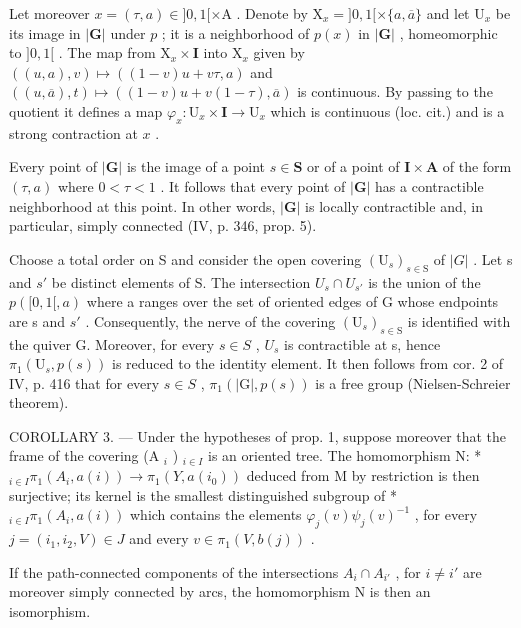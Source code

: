 Let moreover \(x = (\tau, a) \in ]0, 1[ \times \mathrm{A}\) . Denote by \(\mathrm{X}_x = ]0, 1[ \times \{a, \overline{a}\}\) and let \(\mathrm{U}_x\) be its image in \(|\mathbf{G}|\) under \(p\) ; it is a neighborhood of \(p(x)\) in \(|\mathbf{G}|\) , homeomorphic to \(]0, 1[\) . The map from \(\mathrm{X}_x \times \mathbf{I}\) into \(\mathrm{X}_x\) given by \(((u, a), v) \mapsto ((1 - v)u + v\tau, a)\) and \(((u, \overline{a}), t) \mapsto ((1 - v)u + v(1 - \tau), \overline{a})\) is continuous. By passing to the quotient it defines a map \(\varphi_x: \mathrm{U}_x \times \mathbf{I} \to \mathrm{U}_x\) which is continuous (loc. cit.) and is a strong contraction at \(x\) .

Every point of \(|\mathbf{G}|\) is the image of a point \(s \in \mathbf{S}\) or of a point of \(\mathbf{I} \times \mathbf{A}\) of the form \((\tau, a)\) where \(0 < \tau < 1\) . It follows that every point of \(|\mathbf{G}|\) has a contractible neighborhood at this point. In other words, \(|\mathbf{G}|\) is locally contractible and, in particular, simply connected (IV, p. 346, prop. 5).

Choose a total order on S and consider the open covering \((\mathrm{U}_{s})_{s\in\mathrm{S}}\) of \(|G|\) . Let s and \(s'\) be distinct elements of S. The intersection \(U_{s}\cap U_{s'}\) is the union of the \(p([0,1[,a)\) where a ranges over the set of oriented edges of G whose endpoints are s and \(s'\) . Consequently, the nerve of the covering \((\mathrm{U}_{s})_{s\in\mathrm{S}}\) is identified with the quiver G. Moreover, for every \(s\in S\) , \(U_{s}\) is contractible at s, hence \(\pi_{1}(\mathrm{U}_{s},p(s))\) is reduced to the identity element. It then follows from cor. 2 of IV, p. 416 that for every \(s\in S\) , \(\pi_{1}(|\mathrm{G}|,p(s))\) is a free group (Nielsen-Schreier theorem).

COROLLARY 3. --- Under the hypotheses of prop. 1, suppose moreover that the frame of the covering (A \(_{i}\) ) \(_{i\in I}\) is an oriented tree. The homomorphism N: * \(_{i\in I} \pi_{1}(A_{i},a(i)) \to \pi_{1}(Y,a(i_{0}))\) deduced from M by restriction is then surjective; its kernel is the smallest distinguished subgroup of * \(_{i\in I} \pi_{1}(A_{i},a(i))\) which contains the elements \(\varphi_{j}(v)\psi_{j}(v)^{-1}\) , for every \(j = (i_{1},i_{2},V) \in J\) and every \(v \in \pi_{1}(V,b(j))\) .

If the path-connected components of the intersections \(A_{i} \cap A_{i'}\) , for \(i \neq i'\) are moreover simply connected by arcs, the homomorphism N is then an isomorphism.


